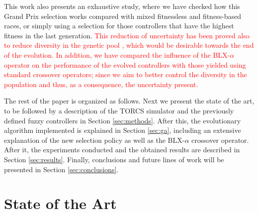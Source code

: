 \documentclass[10pt,journal,compsoc]{IEEEtran}
\begin{document}
This work also presents an exhaustive study, where we have checked how this Grand Prix selection works compared with mixed fitnessless and fitness-based races, or simply using a selection for those controllers that have the highest fitness in the last generation.  
\textcolor{red}{
This reduction of uncertainty has been proved also to reduce diversity in the genetic pool \cite{DBLP:journals/tcci/MereloLFGCCRMGTCC16}, which would be desirable towards the end of the evolution.
In addition, we have compared the influence of the BLX-$\alpha$ operator on the performance of the evolved controllers with those yielded using standard crossover operators; since we aim to better control the diversity in the population and thus, as a consequence, the uncertainty present.
}



The rest of the paper is organized as follows. Next we present the
state of the art, to be followed by a description of the TORCS
simulator and the previously defined fuzzy controllers in Section
\ref{sec:methods}. After this, the evolutionary algorithm implemented
is explained in Section \ref{sec:ga}, including an extensive explanation of the new selection policy as well as the BLX-$\alpha$ crossover operator. After it, the experiments conducted and the obtained results are described in
Section \ref{sec:results}. Finally, conclusions and future lines of
work will be presented in Section \ref{sec:conclusions}. 


\section{State of the Art}
\label{sec:soa}
\end{document}
